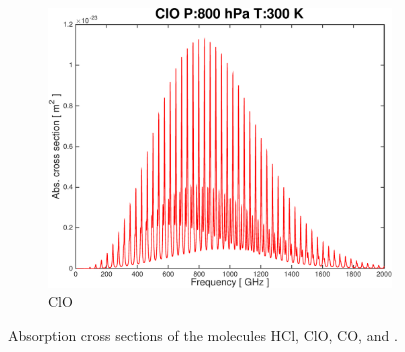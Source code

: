\documentclass[paper=a4, fontsize=11pt]{scrartcl}
\begin{document}
\begin{figure}[ht]
\begin{subfigure}[b]{0.45\textwidth}
        \includegraphics[width=\textwidth]{plots/plot_xsec_ClO_800hPa_300K.pdf}
        \caption{ClO}
    \end{subfigure}

    \caption{Absorption cross sections of the molecules HCl, ClO, CO,
       and .\label{fig:abs_molecules}}
\end{figure}
\end{document}
